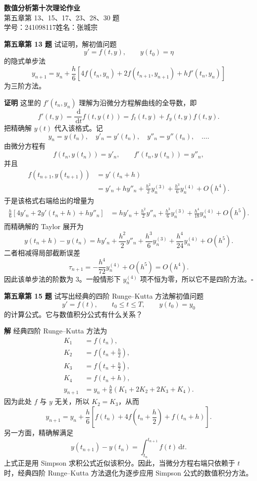 \documentclass[UTF8,a4paper,11pt]{ctexart}
\newcommand{\dd}{\,\mathrm{d}}
\newcommand{\QED}{\hfill$\square$}
\begin{document}
\begin{center}
  {\LARGE\bfseries 数值分析\quad 第十次理论作业}\\[6pt]
  {\large 第五章第 13、15、17、23、28、30 题}\\[4pt]
  {\normalsize 学号：241098117\quad 姓名：张城宗}
\end{center}

\bigskip

\noindent\textbf{第五章\quad 第 13 题}\quad
试证明，解初值问题
\[
  y'=f(t,y),\qquad y(t_0)=\eta
\]
的隐式单步法
\[
  y_{n+1}=y_n+\frac{h}{6}\left[
  4f(t_n,y_n)+2f(t_{n+1},y_{n+1})+h f'(t_n,y_n)
  \right]
\]
为三阶方法。

\medskip
\noindent\textbf{证明}\quad
这里的 \(f'(t_n,y_n)\) 理解为沿微分方程解曲线的全导数，即
\[
  f'(t,y)=\frac{\dd}{\dd t}f(t,y(t))
  = f_t(t,y)+f_y(t,y)f(t,y).
\]
把精确解 \(y(t)\) 代入该格式。记
\[
  y_n=y(t_n),\quad
  y'_n=y'(t_n),\quad y''_n=y''(t_n),\quad \ldots .
\]
由微分方程有
\[
  f(t_n,y(t_n))=y'_n,\qquad
  f'(t_n,y(t_n))=y''_n,
\]
并且
\[
\begin{aligned}
  f(t_{n+1},y(t_{n+1}))
  &=y'(t_n+h)  \\
  &=y'_n+h y''_n+\frac{h^2}{2}y^{(3)}_n
    +\frac{h^3}{6}y^{(4)}_n+O(h^4).
\end{aligned}
\]
于是该格式右端给出的增量为
\[
\begin{aligned}
  \frac{h}{6}\left[
  4y'_n+2y'(t_n+h)+h y''_n
  \right]
  &=h y'_n+\frac{h^2}{2}y''_n
    +\frac{h^3}{6}y^{(3)}_n
    +\frac{h^4}{18}y^{(4)}_n+O(h^5).
\end{aligned}
\]
而精确解的 Taylor 展开为
\[
  y(t_n+h)-y(t_n)
  =h y'_n+\frac{h^2}{2}y''_n
    +\frac{h^3}{6}y^{(3)}_n
    +\frac{h^4}{24}y^{(4)}_n+O(h^5).
\]
二者相减得局部截断误差
\[
  \tau_{n+1}
  =-\frac{h^4}{72}y^{(4)}_n+O(h^5)=O(h^4).
\]
因此该单步法的阶数为 \(3\)。一般情形下 \(y^{(4)}_n\) 项不恒为零，所以它不是四阶方法。\QED

\bigskip\bigskip

\noindent\textbf{第五章\quad 第 15 题}\quad
试写出经典的四阶 Runge--Kutta 方法解初值问题
\[
  y'=f(t),\qquad t_0\le t\le T,\qquad y(t_0)=y_0
\]
的计算公式。它与数值积分公式有什么关系？

\medskip
\noindent\textbf{解}\quad
经典四阶 Runge--Kutta 方法为
\[
\begin{aligned}
  K_1&=f(t_n),\\
  K_2&=f\!\left(t_n+\frac h2\right),\\
  K_3&=f\!\left(t_n+\frac h2\right),\\
  K_4&=f(t_n+h),\\
  y_{n+1}
  &=y_n+\frac h6(K_1+2K_2+2K_3+K_4).
\end{aligned}
\]
因为此处 \(f\) 与 \(y\) 无关，所以 \(K_2=K_3\)，从而
\[
  \boxed{
  y_{n+1}
  =y_n+\frac h6\left[
  f(t_n)+4f\!\left(t_n+\frac h2\right)+f(t_n+h)
  \right].}
\]
另一方面，精确解满足
\[
  y(t_{n+1})-y(t_n)=\int_{t_n}^{t_{n+1}}f(t)\dd t.
\]
上式正是用 Simpson 求积公式近似该积分。因此，当微分方程右端只依赖于 \(t\) 时，经典四阶 Runge--Kutta 方法退化为逐步应用 Simpson 公式的数值积分方法。
\end{document}

